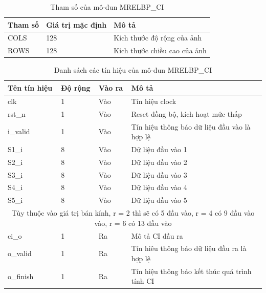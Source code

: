\begin{table}[!ht]
    \centering
    \renewcommand{\arraystretch}{1.3} %
        \caption{Tham số của mô-đun MRELBP\_CI}
    \begin{tabular}{|p{3cm} p{4cm} p{8cm}|}
        \hline
        \rowcolor{gray!30}
        \textbf{Tham số } & \textbf{Giá trị mặc định}  & \textbf{Mô tả} \\
        \hline
        COLS & 128 & Kích thước độ rộng của ảnh
        \\ \hline
        ROWS & 128 & Kích thước chiều cao của ảnh
        \\
        \hline
    \end{tabular}

    \label{tab:paramListCICAL}
\end{table}
\begin{table}[!ht]
    \centering
    \renewcommand{\arraystretch}{1.3} %
    \caption{Danh sách các tín hiệu của mô-đun MRELBP\_CI}
    \begin{tabular}{|p{3cm} p{2cm} p{2cm} p{8cm}|}
        \hline
        \rowcolor{gray!30}
        \textbf{Tên tín hiệu} & \textbf{Độ rộng} & \textbf{Vào ra} & \textbf{Mô tả} \\
        \hline
        clk & 1 & Vào & Tín hiệu clock \\
        \hline
        rst\_n & 1 & Vào & Reset đồng bộ, kích hoạt mức thấp \\
        \hline 
        i\_valid & 1 & Vào & Tín hiệu thông báo dữ liệu đầu vào là hợp lệ
        \\ \hline
        S1\_i & 8 & Vào & Dữ liệu đầu vào 1
        \\ \hline
        S2\_i & 8 & Vào & Dữ liệu đầu vào 2
        \\ \hline
                S3\_i & 8 & Vào & Dữ liệu đầu vào 3
        \\ \hline
                S4\_i & 8 & Vào & Dữ liệu đầu vào 4
        \\ \hline
                        S5\_i & 8 & Vào & Dữ liệu đầu vào 5
        \\ \hline
        \multicolumn{4}{|c|}{Tùy thuộc vào giá trị bán kính, r = 2 thì sẽ có 5 đầu vào, r = 4 có 9 đầu vào vào, r = 6 có 13 đầu vào}
        \\ \hline
        ci\_o & 1 & Ra & Mô tả CI đầu ra
        \\ \hline
        o\_valid & 1 & Ra & Tín hiêu thông báo dữ liệu đầu ra là hợp lệ
        \\ \hline
        o\_finish & 1 & Ra & Tín hiệu thông báo kết thúc quá trình tính CI
        \\ \hline
       
    \end{tabular}

    \label{tab:signalListCICAL}
\end{table}

